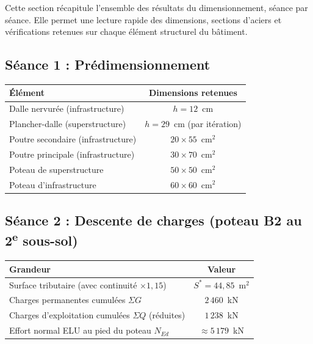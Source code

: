 \clearpage
{}

Cette section récapitule l'ensemble des résultats du dimensionnement, séance par séance. Elle permet une lecture rapide des dimensions, sections d'aciers et vérifications retenues sur chaque élément structurel du bâtiment.

\subsection*{Séance 1 : Prédimensionnement}

\begin{tabularx}{\linewidth}{Xc}
\toprule
\textbf{Élément} & \textbf{Dimensions retenues} \\
\midrule
Dalle nervurée (infrastructure)              & $h = 12$~cm \\
Plancher-dalle (superstructure)              & $h = 29$~cm (par itération) \\
Poutre secondaire (infrastructure)           & $20 \times 55$~cm$^{2}$ \\
Poutre principale (infrastructure)           & $30 \times 70$~cm$^{2}$ \\
Poteau de superstructure                     & $50 \times 50$~cm$^{2}$ \\
Poteau d'infrastructure                      & $60 \times 60$~cm$^{2}$ \\
\bottomrule
\end{tabularx}

\subsection*{Séance 2 : Descente de charges (poteau B2 au 2\textsuperscript{e} sous-sol)}

\begin{tabularx}{\linewidth}{Xc}
\toprule
\textbf{Grandeur} & \textbf{Valeur} \\
\midrule
Surface tributaire (avec continuité $\times 1{,}15$) & $S^* = 44{,}85$~m$^{2}$ \\
Charges permanentes cumulées $\Sigma G$              & $2\,460$~kN \\
Charges d'exploitation cumulées $\Sigma Q$ (réduites) & $1\,238$~kN \\
Effort normal ELU au pied du poteau $N_{Ed}$         & $\approx 5\,179$~kN \\
\bottomrule
\end{tabularx}

